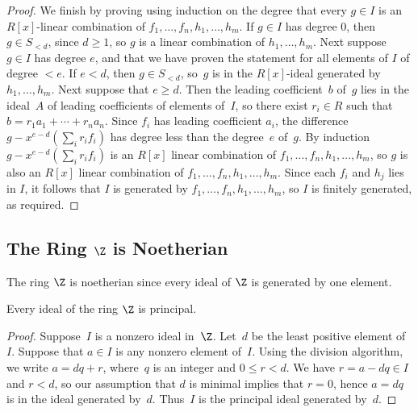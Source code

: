 \begin{proof}
We finish by proving using induction on the degree that every $g\in I$ is an
$R[x]$-linear combination of $f_1,\ldots, f_n, h_1,\ldots, h_m$.
If $g\in I$ has degree $0$, then $g \in S_{<d}$, since $d\geq 1$, so
$g$ is a linear combination of $h_1,\ldots, h_m$.  Next suppose
$g\in I$ has degree $e$, and that we have proven the statement
for all elements of $I$ of degree $<e$.
If $e<d$, then $g\in S_{<d}$, so~$g$ is
in the $R[x]$-ideal generated by $h_1,\ldots, h_m$.  Next suppose
that $e\geq d$.  Then the leading coefficient~$b$
of~$g$ lies in the ideal~$A$ of leading coefficients of elements of~$I$, so there
exist $r_i\in R$ such that $b=r_1 a_1 + \cdots + r_n a_n$.  Since
$f_i$ has leading coefficient $a_i$, the difference $g- x^{e-d} (\sum_i r_i f_i)$ has degree less than the degree~$e$ of~$g$.  By induction $g-x^{e-d} (\sum_i r_i f_i)$ is an $R[x]$ linear combination of $f_1,\ldots, f_n,
h_1,\ldots, h_m$, so $g$ is also an $R[x]$ linear combination of
$f_1,\ldots, f_n, h_1,\ldots, h_m$.  Since each $f_i$ and $h_j$ lies in
$I$, it follows that $I$ is generated by $f_1,\ldots, f_n, h_1,\ldots,
h_m$, so $I$ is finitely generated, as required.
\end{proof}

\subsection{The Ring $\Z$ is Noetherian}\label{sec:Znoeth}

The ring $\Z$ is noetherian since every ideal of $\Z$ is
generated by one element.
\begin{proposition}\label{prop:zpid}
	Every ideal of the ring $\Z$ is principal.
\end{proposition}
\begin{proof}
	Suppose~$I$ is a nonzero ideal in~$\Z$. Let~$d$ be the least positive
	element of~$I$.  Suppose that $a\in I$ is any nonzero element of~$I$.
	Using the division algorithm, we write $a=dq + r$, where~$q$ is an
	integer and $0\leq r < d$.  We have $r=a-dq\in I$ and $r<d$, so our
	assumption that $d$ is minimal implies that $r=0$, hence $a=dq$ is in
	the ideal generated by~$d$. Thus~$I$ is the principal ideal generated
	by~$d$.
\end{proof}

